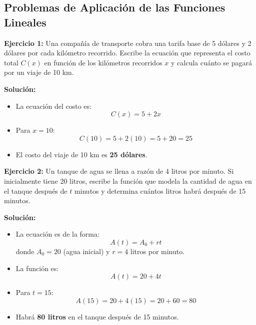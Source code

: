 \documentclass{profesor}
\begin{document}
\newpage
\subsection{Problemas de Aplicación de las Funciones Lineales}

\textbf{Ejercicio 1:}  
Una compañía de transporte cobra una tarifa base de 5 dólares y 2 dólares por cada kilómetro recorrido. Escribe la ecuación que representa el costo total \( C(x) \) en función de los kilómetros recorridos \( x \) y calcula cuánto se pagará por un viaje de 10 km.

\textbf{Solución:}  
\begin{itemize}
    \item La ecuación del costo es:
    \[
    C(x) = 5 + 2x
    \]
    \item Para \( x = 10 \):
    \[
    C(10) = 5 + 2(10) = 5 + 20 = 25
    \]
    \item El costo del viaje de 10 km es \textbf{25 dólares}.
\end{itemize}

\textbf{Ejercicio 2:}  
Un tanque de agua se llena a razón de 4 litros por minuto. Si inicialmente tiene 20 litros, escribe la función que modela la cantidad de agua en el tanque después de \( t \) minutos y determina cuántos litros habrá después de 15 minutos.

\textbf{Solución:}  
\begin{itemize}
    \item La ecuación es de la forma:
    \[
    A(t) = A_0 + rt
    \]
    donde \( A_0 = 20 \) (agua inicial) y \( r = 4 \) litros por minuto.
    \item La función es:
    \[
    A(t) = 20 + 4t
    \]
    \item Para \( t = 15 \):
    \[
    A(15) = 20 + 4(15) = 20 + 60 = 80
    \]
    \item Habrá \textbf{80 litros} en el tanque después de 15 minutos.
\end{itemize}
\end{document}

